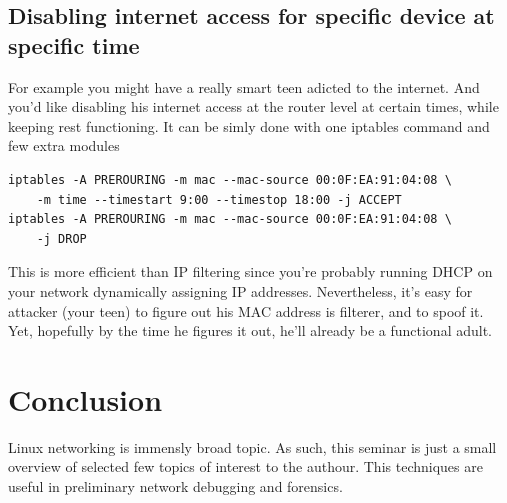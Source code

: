 \documentclass[times, utf8, seminar, english]{fer}
\begin{document}
\section{Disabling internet access for specific device at specific time}

For example you might have a really smart teen adicted to the internet.
And you'd like disabling his internet access at the router level at certain times, while keeping rest functioning.
It can be simly done with one iptables command and few extra modules

\begin{verbatim}
iptables -A PREROURING -m mac --mac-source 00:0F:EA:91:04:08 \
    -m time --timestart 9:00 --timestop 18:00 -j ACCEPT
iptables -A PREROURING -m mac --mac-source 00:0F:EA:91:04:08 \
    -j DROP
\end{verbatim}

This is more efficient than IP filtering since you're probably running DHCP on your network dynamically assigning IP addresses.
Nevertheless, it's easy for attacker (your teen) to figure out his MAC address is filterer, and to spoof it.
Yet, hopefully by the time he figures it out, he'll already be a functional adult.

\chapter{Conclusion}

Linux networking is immensly broad topic. As such, this seminar is just a small overview of selected few topics of interest to the authour. This techniques are useful in preliminary network debugging and forensics.




\end{document}
